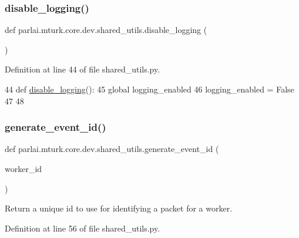 \subsubsection{\texorpdfstring{disable\+\_\+logging()}{disable\_logging()}}
{\footnotesize\ttfamily def parlai.\+mturk.\+core.\+dev.\+shared\+\_\+utils.\+disable\+\_\+logging (\begin{DoxyParamCaption}{ }\end{DoxyParamCaption})}



Definition at line 44 of file shared\+\_\+utils.\+py.


\begin{DoxyCode}
44 \textcolor{keyword}{def }\hyperlink{namespaceparlai_1_1mturk_1_1core_1_1shared__utils_ac9c2cb4e45eb5bb480df0cd8b18c64da}{disable\_logging}():
45     \textcolor{keyword}{global} logging\_enabled
46     logging\_enabled = \textcolor{keyword}{False}
47 
48 
\end{DoxyCode}
\mbox{\label{namespaceparlai_1_1mturk_1_1core_1_1dev_1_1shared__utils_a95fa6a517a734351c159f2811d04af05}} 
\subsubsection{\texorpdfstring{generate\+\_\+event\+\_\+id()}{generate\_event\_id()}}
{\footnotesize\ttfamily def parlai.\+mturk.\+core.\+dev.\+shared\+\_\+utils.\+generate\+\_\+event\+\_\+id (\begin{DoxyParamCaption}\item[{}]{worker\+\_\+id }\end{DoxyParamCaption})}

\begin{DoxyVerb}Return a unique id to use for identifying a packet for a worker.
\end{DoxyVerb}
 

Definition at line 56 of file shared\+\_\+utils.\+py.


